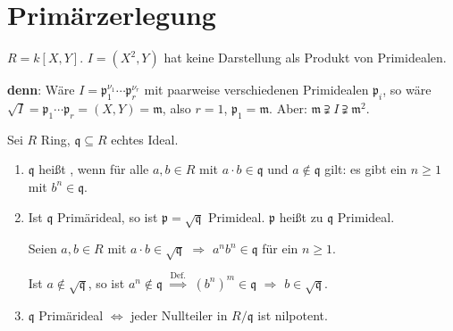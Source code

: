 \section{Primärzerlegung}

\begin{nnBsp}
$R = k[X,Y]$. $I = (X^2, Y)$ hat keine Darstellung als Produkt von Primidealen.

\textbf{denn}: Wäre $I = \mathfrak{p}_1^{\nu_1} \cdots \mathfrak{p}_r^{\nu_r}$ mit paarweise verschiedenen Primidealen $\mathfrak{p}_i$, so wäre $\sqrt{I} = \mathfrak{p}_1 \cdots \mathfrak{p}_r = (X,Y) = \mathfrak{m}$, also $r = 1$, $\mathfrak{p}_1 = \mathfrak{m}$. Aber: $\mathfrak{m} \supsetneqq I \supsetneqq \mathfrak{m}^2$.

\end{nnBsp}

\begin{DefBem}
Sei $R$ Ring, $\mathfrak{q} \subseteq R$ echtes Ideal.

\begin{enumerate}
\item $\mathfrak{q}$ heißt , wenn für alle $a,b \in R$ mit $a \cdot b \in \mathfrak{q}$ und $a \notin \mathfrak{q}$ gilt: es gibt ein $n \geq 1$ mit $b^n \in \mathfrak{q}$.

\item Ist $\mathfrak{q}$ Primärideal, so ist $\mathfrak{p} = \sqrt{\mathfrak{q}}$ Primideal. $\mathfrak{p}$ heißt zu $\mathfrak{q}$  Primideal.

\begin{Bew}
Seien $a, b \in R$ mit $a \cdot b \in \sqrt{\mathfrak{q}}$ $\Rightarrow$ $a^n b^n \in \mathfrak{q}$ für ein $n \geq 1$.

Ist $a \notin \sqrt{\mathfrak{q}}$, so ist $a^n \notin \mathfrak{q}$
$\overset{\text{Def.}}{\Rightarrow}$ $(b^n)^m \in \mathfrak{q}$ $\Rightarrow$
$b \in \sqrt{\mathfrak{q}}$.
\end{Bew}

\item $\mathfrak{q}$ Primärideal $\Leftrightarrow$ jeder Nullteiler in $R / \mathfrak{q}$ ist nilpotent.

\end{enumerate}
\end{DefBem}

